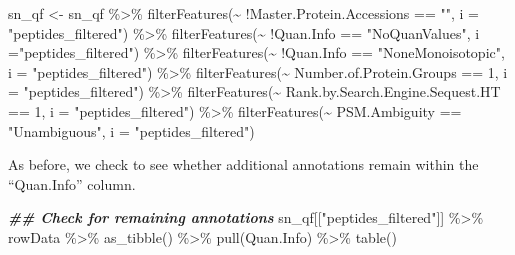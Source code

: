 \documentclass[9pt,a4paper,]{extarticle}
\newenvironment{Shaded}{\begin{snugshade}}{\end{snugshade}}
\newcommand{\AttributeTok}[1]{\textcolor[rgb]{0.77,0.63,0.00}{#1}}
\newcommand{\DecValTok}[1]{\textcolor[rgb]{0.00,0.00,0.81}{#1}}
\newcommand{\DocumentationTok}[1]{\textcolor[rgb]{0.56,0.35,0.01}{\textbf{\textit{#1}}}}
\newcommand{\FunctionTok}[1]{\textcolor[rgb]{0.00,0.00,0.00}{#1}}
\newcommand{\NormalTok}[1]{#1}
\newcommand{\OtherTok}[1]{\textcolor[rgb]{0.56,0.35,0.01}{#1}}
\newcommand{\SpecialCharTok}[1]{\textcolor[rgb]{0.00,0.00,0.00}{#1}}
\newcommand{\StringTok}[1]{\textcolor[rgb]{0.31,0.60,0.02}{#1}}
\begin{document}
\begin{Shaded}
\begin{Highlighting}[]
\NormalTok{sn\_qf }\OtherTok{\textless{}{-}}\NormalTok{ sn\_qf }\SpecialCharTok{\%\textgreater{}\%}
  \FunctionTok{filterFeatures}\NormalTok{(}\SpecialCharTok{\textasciitilde{}} \SpecialCharTok{!}\NormalTok{Master.Protein.Accessions }\SpecialCharTok{==} \StringTok{""}\NormalTok{, }
                 \AttributeTok{i =} \StringTok{"peptides\_filtered"}\NormalTok{) }\SpecialCharTok{\%\textgreater{}\%}
  \FunctionTok{filterFeatures}\NormalTok{(}\SpecialCharTok{\textasciitilde{}} \SpecialCharTok{!}\NormalTok{Quan.Info }\SpecialCharTok{==} \StringTok{"NoQuanValues"}\NormalTok{, }
                 \AttributeTok{i =}\StringTok{"peptides\_filtered"}\NormalTok{) }\SpecialCharTok{\%\textgreater{}\%}
  \FunctionTok{filterFeatures}\NormalTok{(}\SpecialCharTok{\textasciitilde{}} \SpecialCharTok{!}\NormalTok{Quan.Info }\SpecialCharTok{==} \StringTok{"NoneMonoisotopic"}\NormalTok{,}
                 \AttributeTok{i =} \StringTok{"peptides\_filtered"}\NormalTok{) }\SpecialCharTok{\%\textgreater{}\%}
  \FunctionTok{filterFeatures}\NormalTok{(}\SpecialCharTok{\textasciitilde{}}\NormalTok{ Number.of.Protein.Groups }\SpecialCharTok{==} \DecValTok{1}\NormalTok{, }
                 \AttributeTok{i =} \StringTok{"peptides\_filtered"}\NormalTok{) }\SpecialCharTok{\%\textgreater{}\%}
  \FunctionTok{filterFeatures}\NormalTok{(}\SpecialCharTok{\textasciitilde{}}\NormalTok{ Rank.by.Search.Engine.Sequest.HT }\SpecialCharTok{==} \DecValTok{1}\NormalTok{, }
                 \AttributeTok{i =} \StringTok{"peptides\_filtered"}\NormalTok{) }\SpecialCharTok{\%\textgreater{}\%}
  \FunctionTok{filterFeatures}\NormalTok{(}\SpecialCharTok{\textasciitilde{}}\NormalTok{ PSM.Ambiguity }\SpecialCharTok{==} \StringTok{"Unambiguous"}\NormalTok{,}
                 \AttributeTok{i =} \StringTok{"peptides\_filtered"}\NormalTok{)}
\end{Highlighting}
\end{Shaded}

As before, we check to see whether additional annotations remain within the
``Quan.Info'' column.

\begin{Shaded}
\begin{Highlighting}[]
\DocumentationTok{\#\# Check for remaining annotations}
\NormalTok{sn\_qf[[}\StringTok{"peptides\_filtered"}\NormalTok{]] }\SpecialCharTok{\%\textgreater{}\%}
\NormalTok{  rowData }\SpecialCharTok{\%\textgreater{}\%}
  \FunctionTok{as\_tibble}\NormalTok{() }\SpecialCharTok{\%\textgreater{}\%}
  \FunctionTok{pull}\NormalTok{(Quan.Info) }\SpecialCharTok{\%\textgreater{}\%}
  \FunctionTok{table}\NormalTok{()}
\end{Highlighting}
\end{Shaded}
\end{document}
